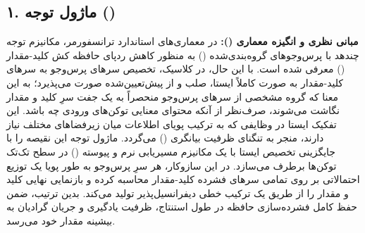 
\subsection*{۱. ماژول توجه  ()}

\textbf{مبانی نظری و انگیزه معماری ():}
در معماری‌های استاندارد ترانسفورمر، مکانیزم توجه چندهد با پرس‌وجوهای گروه‌بندی‌شده () به منظور کاهش ردپای حافظه کش کلید-مقدار () معرفی شده است. با این حال، در  کلاسیک، تخصیص سرهای پرس‌وجو به سرهای کلید-مقدار به صورت کاملاً ایستا، صلب و از پیش‌تعیین‌شده صورت می‌پذیرد؛ به این معنا که گروه مشخصی از سرهای پرس‌وجو منحصراً به یک جفت سرِ کلید و مقدار نگاشت می‌شوند، صرف‌نظر از آنکه محتوای معنایی توکن‌های ورودی چه باشد. این تفکیک ایستا در وظایفی که به ترکیب پویای اطلاعات میان زیرفضاهای مختلف نیاز دارند، منجر به تنگنای ظرفیت بیانگری () می‌گردد.
ماژول توجه  این نقیصه را با جایگزینی تخصیص ایستا با یک مکانیزم مسیریابی نرم و پیوسته () در سطح تک‌تک توکن‌ها برطرف می‌سازد. در این سازوکار، هر سرِ پرس‌وجو به طور پویا یک توزیع احتمالاتی بر روی تمامی سرهای فشرده کلید-مقدار محاسبه کرده و بازنمایی نهایی کلید و مقدار را از طریق یک ترکیب خطی دیفرانسیل‌پذیر تولید می‌کند. بدین ترتیب، ضمن حفظ کامل فشرده‌سازی حافظه  در طول استنتاج، ظرفیت یادگیری و جریان گرادیان به بیشینه مقدار خود می‌رسد.

